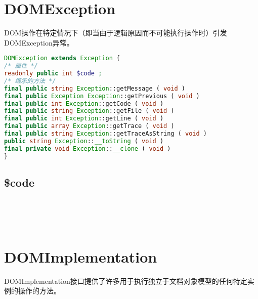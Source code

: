 \section{DOMException}

DOM操作在特定情况下（即当由于逻辑原因而不可能执行操作时）引发DOMException异常。


\begin{lstlisting}[language=PHP]
DOMException extends Exception {
/* 属性 */
readonly public int $code ;
/* 继承的方法 */
final public string Exception::getMessage ( void )
final public Exception Exception::getPrevious ( void )
final public int Exception::getCode ( void )
final public string Exception::getFile ( void )
final public int Exception::getLine ( void )
final public array Exception::getTrace ( void )
final public string Exception::getTraceAsString ( void )
public string Exception::__toString ( void )
final private void Exception::__clone ( void )
}
\end{lstlisting}

\subsection{\$code}


\begin{lstlisting}[language=PHP]

\end{lstlisting}


\begin{lstlisting}[language=PHP]

\end{lstlisting}


\begin{lstlisting}[language=PHP]

\end{lstlisting}


\begin{lstlisting}[language=PHP]

\end{lstlisting}


\begin{lstlisting}[language=PHP]

\end{lstlisting}
\section{DOMImplementation}


DOMImplementation接口提供了许多用于执行独立于文档对象模型的任何特定实例的操作的方法。

